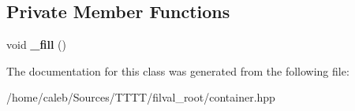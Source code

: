 \subsection*{Private Member Functions}
\begin{DoxyCompactItemize}
\item 
\hypertarget{classfv_1_1root_1_1ContainerTH1_afd4218b3b43bba19cf5079439e7ce51f}{}\label{classfv_1_1root_1_1ContainerTH1_afd4218b3b43bba19cf5079439e7ce51f} 
void {\bfseries \+\_\+fill} ()
\end{DoxyCompactItemize}


The documentation for this class was generated from the following file\+:\begin{DoxyCompactItemize}
\item 
/home/caleb/\+Sources/\+T\+T\+T\+T/filval\+\_\+root/container.\+hpp\end{DoxyCompactItemize}
